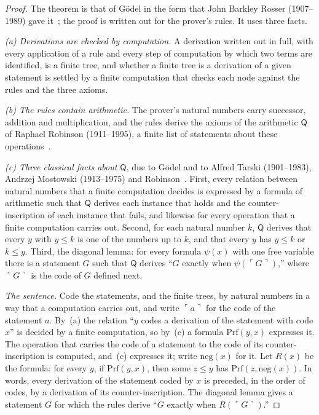 \documentclass[11pt]{article}
\theoremstyle{definition}
\theoremstyle{remark}
\begin{document}
\begin{proof}
The theorem is that of G\"odel in the form that John Barkley Rosser (1907--1989) gave it~\citep{godel31,rosser}; the proof is written out for the prover's rules. It uses three facts.

\emph{(a) Derivations are checked by computation.} A derivation written out in full, with every application of a rule and every step of computation by which two terms are identified, is a finite tree, and whether a finite tree is a derivation of a given statement is settled by a finite computation that checks each node against the rules and the three axioms.

\emph{(b) The rules contain arithmetic.} The prover's natural numbers carry successor, addition and multiplication, and the rules derive the axioms of the arithmetic $\mathsf Q$ of Raphael Robinson (1911--1995), a finite list of statements about these operations~\citep{tmr}.

\emph{(c) Three classical facts about $\mathsf Q$}, due to G\"odel and to Alfred Tarski (1901--1983), Andrzej Mostowski (1913--1975) and Robinson~\citep{godel31,tmr}. First, every relation between natural numbers that a finite computation decides is expressed by a formula of arithmetic such that $\mathsf Q$ derives each instance that holds and the counter-inscription of each instance that fails, and likewise for every operation that a finite computation carries out. Second, for each natural number $k$, $\mathsf Q$ derives that every $y$ with $y\le k$ is one of the numbers up to $k$, and that every $y$ has $y\le k$ or $k\le y$. Third, the diagonal lemma: for every formula $\psi(x)$ with one free variable there is a statement $G$ such that $\mathsf Q$ derives ``$G$ exactly when $\psi(\ulcorner G\urcorner)$,'' where $\ulcorner G\urcorner$ is the code of $G$ defined next.

\emph{The sentence.} Code the statements, and the finite trees, by natural numbers in a way that a computation carries out, and write $\ulcorner a\urcorner$ for the code of the statement $a$. By~(a) the relation ``$y$ codes a derivation of the statement with code $x$'' is decided by a finite computation, so by~(c) a formula $\mathrm{Prf}(y,x)$ expresses it. The operation that carries the code of a statement to the code of its counter-inscription is computed, and~(c) expresses it; write $\mathrm{neg}(x)$ for it. Let $R(x)$ be the formula: for every $y$, if $\mathrm{Prf}(y,x)$, then some $z\le y$ has $\mathrm{Prf}(z,\mathrm{neg}(x))$. In words, every derivation of the statement coded by $x$ is preceded, in the order of codes, by a derivation of its counter-inscription. The diagonal lemma gives a statement $G$ for which the rules derive ``$G$ exactly when $R(\ulcorner G\urcorner)$.''


\end{proof}
\end{document}
